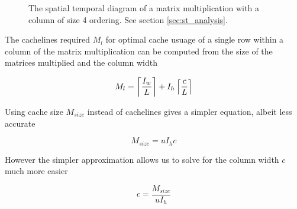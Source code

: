 \begin{figure}[ht]
    \centering
    \caption{
        The spatial temporal diagram of a matrix multiplication with a column of size 4 ordering.
        See section \ref{sec:st_analysis}.
    }
    \label{fig:st_matrix_column}
\end{figure}

The cachelines required $M_l$ for optimal cache usuage of a single row within a column of the matrix multiplication can be computed from the size of the matrices multiplied and the column width

\[
    M_{l} = \left\lceil \frac{I_w}{L} \right\rceil + I_h\left\lceil \frac{c}{L} \right\rceil
\]

Using cache size $M_{size}$ instead of cachelines gives a simpler equation, albeit less accurate

\[
    M_{size} = u I_h c 
\]

However the simpler approximation allows us to solve for the column width $c$ much more easier 

\[
    c = \frac{M_{size}}{u I_h}
\]
